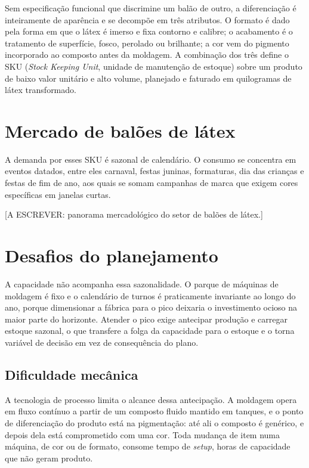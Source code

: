 \documentclass[
    12pt,
    openright,
    oneside,
    a4paper,
    fleqn,
    chapter=TITLE,
    section=TITLE,
    english,
    brazil
]{abntex2}
\begin{document}
Sem especificação funcional que discrimine um balão de outro, a diferenciação é inteiramente de aparência e se decompõe em três atributos. O formato é dado pela forma em que o látex é imerso e fixa contorno e calibre; o acabamento é o tratamento de superfície, fosco, perolado ou brilhante; a cor vem do pigmento incorporado ao composto antes da moldagem. A combinação dos três define o SKU (\textit{Stock Keeping Unit}, unidade de manutenção de estoque) sobre um produto de baixo valor unitário e alto volume, planejado e faturado em quilogramas de látex transformado.

\section{Mercado de balões de látex}
\label{sec:mercado}

A demanda por esses SKU é sazonal de calendário. O consumo se concentra em eventos datados, entre eles carnaval, festas juninas, formaturas, dia das crianças e festas de fim de ano, aos quais se somam campanhas de marca que exigem cores específicas em janelas curtas.

[A ESCREVER: panorama mercadológico do setor de balões de látex.]

\section{Desafios do planejamento}
\label{sec:problema}

A capacidade não acompanha essa sazonalidade. O parque de máquinas de moldagem é fixo e o calendário de turnos é praticamente invariante ao longo do ano, porque dimensionar a fábrica para o pico deixaria o investimento ocioso na maior parte do horizonte. Atender o pico exige antecipar produção e carregar estoque sazonal, o que transfere a folga da capacidade para o estoque e o torna variável de decisão em vez de consequência do plano.

\subsection{Dificuldade mecânica}

A tecnologia de processo limita o alcance dessa antecipação. A moldagem opera em fluxo contínuo a partir de um composto fluido mantido em tanques, e o ponto de diferenciação do produto está na pigmentação: até ali o composto é genérico, e depois dela está comprometido com uma cor. Toda mudança de item numa máquina, de cor ou de formato, consome tempo de \textit{setup}, horas de capacidade que não geram produto.
\end{document}
